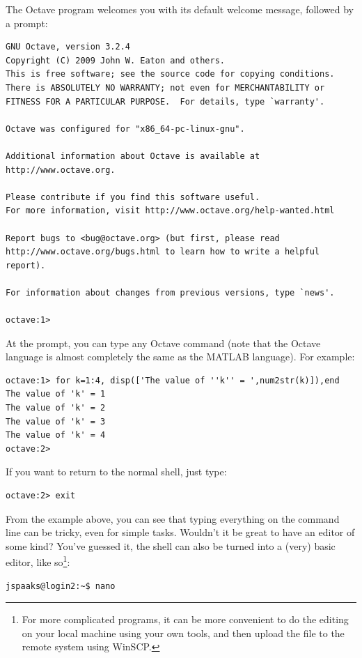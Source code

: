 The Octave program welcomes you with its default welcome message, followed by a prompt:
\begin{lstlisting}[style=basic,style=bash]
GNU Octave, version 3.2.4
Copyright (C) 2009 John W. Eaton and others.
This is free software; see the source code for copying conditions.
There is ABSOLUTELY NO WARRANTY; not even for MERCHANTABILITY or
FITNESS FOR A PARTICULAR PURPOSE.  For details, type `warranty'.

Octave was configured for "x86_64-pc-linux-gnu".

Additional information about Octave is available at http://www.octave.org.

Please contribute if you find this software useful.
For more information, visit http://www.octave.org/help-wanted.html

Report bugs to <bug@octave.org> (but first, please read
http://www.octave.org/bugs.html to learn how to write a helpful report).

For information about changes from previous versions, type `news'.

octave:1>
\end{lstlisting}
At the prompt, you can type any Octave command (note that the Octave language is almost completely the same as the MATLAB language). For example:
\begin{lstlisting}[style=basic,style=bash]
octave:1> for k=1:4, disp(['The value of ''k'' = ',num2str(k)]),end
The value of 'k' = 1
The value of 'k' = 2
The value of 'k' = 3
The value of 'k' = 4
octave:2>
\end{lstlisting}
If you want to return to the normal shell, just type:
\begin{lstlisting}[style=basic,style=bash]
octave:2> exit
\end{lstlisting}

From the example above, you can see that typing everything on the command line can be tricky, even for simple tasks. Wouldn't it be great to have an editor of some kind? You've guessed it, the shell can also be turned into a (very) basic editor, like so\footnote{For more complicated programs, it can be more convenient to do the editing on your local machine using your own tools, and then upload the file to the remote system using WinSCP.}:
\begin{lstlisting}[style=basic,style=bash]
jspaaks@login2:~$ nano
\end{lstlisting}

